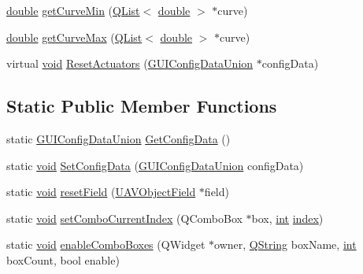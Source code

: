 \begin{DoxyCompactItemize}
\item 
\hyperlink{_super_l_u_support_8h_a8956b2b9f49bf918deed98379d159ca7}{double} \hyperlink{group___config_plugin_gae535c3bae8862f72e05f9247a3921b78}{get\-Curve\-Min} (\hyperlink{class_q_list}{Q\-List}$<$ \hyperlink{_super_l_u_support_8h_a8956b2b9f49bf918deed98379d159ca7}{double} $>$ $\ast$curve)
\item 
\hyperlink{_super_l_u_support_8h_a8956b2b9f49bf918deed98379d159ca7}{double} \hyperlink{group___config_plugin_ga7d87a7cb73a87543dc94b23e4e4132d8}{get\-Curve\-Max} (\hyperlink{class_q_list}{Q\-List}$<$ \hyperlink{_super_l_u_support_8h_a8956b2b9f49bf918deed98379d159ca7}{double} $>$ $\ast$curve)
\item 
virtual \hyperlink{group___u_a_v_objects_plugin_ga444cf2ff3f0ecbe028adce838d373f5c}{void} \hyperlink{group___config_plugin_ga583ace2f123682515cbed3f87bd6e9fc}{Reset\-Actuators} (\hyperlink{union_g_u_i_config_data_union}{G\-U\-I\-Config\-Data\-Union} $\ast$config\-Data)
\end{DoxyCompactItemize}
\subsection*{Static Public Member Functions}
\begin{DoxyCompactItemize}
\item 
static \hyperlink{union_g_u_i_config_data_union}{G\-U\-I\-Config\-Data\-Union} \hyperlink{group___config_plugin_gae2c0e1bb819f6b9c95402cea8702e177}{Get\-Config\-Data} ()
\item 
static \hyperlink{group___u_a_v_objects_plugin_ga444cf2ff3f0ecbe028adce838d373f5c}{void} \hyperlink{group___config_plugin_ga0a6981811a5b0f3c144bde081c414da0}{Set\-Config\-Data} (\hyperlink{union_g_u_i_config_data_union}{G\-U\-I\-Config\-Data\-Union} config\-Data)
\item 
static \hyperlink{group___u_a_v_objects_plugin_ga444cf2ff3f0ecbe028adce838d373f5c}{void} \hyperlink{group___config_plugin_ga5d58a26e503e6a3d9a565932148036ce}{reset\-Field} (\hyperlink{class_u_a_v_object_field}{U\-A\-V\-Object\-Field} $\ast$field)
\item 
static \hyperlink{group___u_a_v_objects_plugin_ga444cf2ff3f0ecbe028adce838d373f5c}{void} \hyperlink{group___config_plugin_ga56c01e65c75f32c462e8a5191fabffce}{set\-Combo\-Current\-Index} (Q\-Combo\-Box $\ast$box, \hyperlink{ioapi_8h_a787fa3cf048117ba7123753c1e74fcd6}{int} \hyperlink{glext_8h_ab47dd9958bcadea08866b42bf358e95e}{index})
\item 
static \hyperlink{group___u_a_v_objects_plugin_ga444cf2ff3f0ecbe028adce838d373f5c}{void} \hyperlink{group___config_plugin_ga80929dea8a5f354f9d7df8162e027b29}{enable\-Combo\-Boxes} (Q\-Widget $\ast$owner, \hyperlink{group___u_a_v_objects_plugin_gab9d252f49c333c94a72f97ce3105a32d}{Q\-String} box\-Name, \hyperlink{ioapi_8h_a787fa3cf048117ba7123753c1e74fcd6}{int} box\-Count, bool enable)
\end{DoxyCompactItemize}
